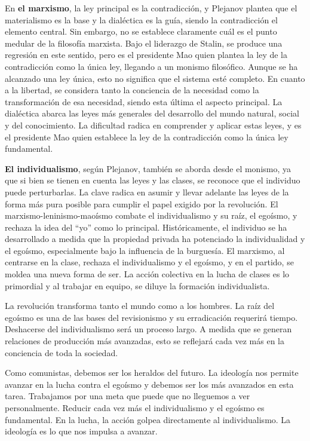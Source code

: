 \documentclass[
  a4paper,
]{article}
\begin{document}
En \textbf{el marxismo}, la ley principal es la contradicción, y
Plejanov plantea que el materialismo es la base y la dialéctica es la
guía, siendo la contradicción el elemento central. Sin embargo, no se
establece claramente cuál es el punto medular de la filosofía marxista.
Bajo el liderazgo de Stalin, se produce una regresión en este sentido,
pero es el presidente Mao quien plantea la ley de la contradicción como
la única ley, llegando a un monismo filosófico. Aunque se ha alcanzado
una ley única, esto no significa que el sistema esté completo. En cuanto
a la libertad, se considera tanto la conciencia de la necesidad como la
transformación de esa necesidad, siendo esta última el aspecto
principal. La dialéctica abarca las leyes más generales del desarrollo
del mundo natural, social y del conocimiento. La dificultad radica en
comprender y aplicar estas leyes, y es el presidente Mao quien establece
la ley de la contradicción como la única ley fundamental.

\textbf{El individualismo}, según Plejanov, también se aborda desde el
monismo, ya que si bien se tienen en cuenta las leyes y las clases, se
reconoce que el individuo puede perturbarlas. La clave radica en asumir
y llevar adelante las leyes de la forma más pura posible para cumplir el
papel exigido por la revolución. El marxismo-leninismo-maoísmo combate
el individualismo y su raíz, el egoísmo, y rechaza la idea del ``yo''
como lo principal. Históricamente, el individuo se ha desarrollado a
medida que la propiedad privada ha potenciado la individualidad y el
egoísmo, especialmente bajo la influencia de la burguesía. El marxismo,
al centrarse en la clase, rechaza el individualismo y el egoísmo, y en
el partido, se moldea una nueva forma de ser. La acción colectiva en la
lucha de clases es lo primordial y al trabajar en equipo, se diluye la
formación individualista.

La revolución transforma tanto el mundo como a los hombres. La raíz del
egoísmo es una de las bases del revisionismo y su erradicación requerirá
tiempo. Deshacerse del individualismo será un proceso largo. A medida
que se generan relaciones de producción más avanzadas, esto se reflejará
cada vez más en la conciencia de toda la sociedad.

Como comunistas, debemos ser los heraldos del futuro. La ideología nos
permite avanzar en la lucha contra el egoísmo y debemos ser los más
avanzados en esta tarea. Trabajamos por una meta que puede que no
lleguemos a ver personalmente. Reducir cada vez más el individualismo y
el egoísmo es fundamental. En la lucha, la acción golpea directamente al
individualismo. La ideología es lo que nos impulsa a avanzar.


\printbibliography
\end{document}

